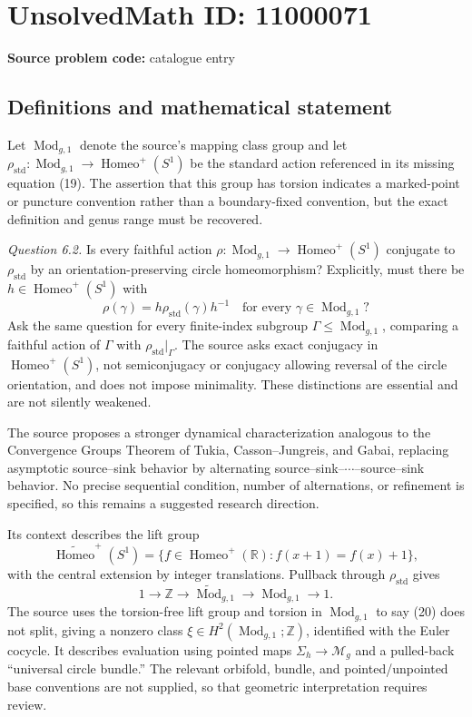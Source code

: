 \documentclass[11pt]{article}
\newcommand{\Z}{\mathbb{Z}}
\newcommand{\R}{\mathbb{R}}
\begin{document}
\section*{UnsolvedMath ID: 11000071}
\textbf{Source problem code:} catalogue entry
\subsection{Definitions and mathematical statement}
Let \(\operatorname{Mod}_{g,1}\) denote the source's mapping class group and let \(\rho_{\mathrm{std}}:\operatorname{Mod}_{g,1}\to\operatorname{Homeo}^+(S^1)\) be the standard action referenced in its missing equation (19). The assertion that this group has torsion indicates a marked-point or puncture convention rather than a boundary-fixed convention, but the exact definition and genus range must be recovered.

\emph{Question 6.2.} Is every faithful action \(\rho:\operatorname{Mod}_{g,1}\to\operatorname{Homeo}^+(S^1)\) conjugate to \(\rho_{\mathrm{std}}\) by an orientation-preserving circle homeomorphism? Explicitly, must there be \(h\in\operatorname{Homeo}^+(S^1)\) with
\[
 \rho(\gamma)=h\rho_{\mathrm{std}}(\gamma)h^{-1}
 \quad\text{for every }\gamma\in\operatorname{Mod}_{g,1}?
\]
Ask the same question for every finite-index subgroup \(\Gamma\leq\operatorname{Mod}_{g,1}\), comparing a faithful action of \(\Gamma\) with \(\rho_{\mathrm{std}}|_\Gamma\). The source asks exact conjugacy in \(\operatorname{Homeo}^+(S^1)\), not semiconjugacy or conjugacy allowing reversal of the circle orientation, and does not impose minimality. These distinctions are essential and are not silently weakened.

The source proposes a stronger dynamical characterization analogous to the Convergence Groups Theorem of Tukia, Casson--Jungreis, and Gabai, replacing asymptotic source--sink behavior by alternating source--sink--\(\cdots\)--source--sink behavior. No precise sequential condition, number of alternations, or refinement is specified, so this remains a suggested research direction.

Its context describes the lift group
\[
 \widetilde{\operatorname{Homeo}}^+(S^1)
 =\{f\in\operatorname{Homeo}^+(\R):f(x+1)=f(x)+1\},
\]
with the central extension by integer translations. Pullback through \(\rho_{\mathrm{std}}\) gives
\[
 1\longrightarrow\Z\longrightarrow
 \widetilde{\operatorname{Mod}}_{g,1}
 \longrightarrow\operatorname{Mod}_{g,1}\longrightarrow1.
 \tag{20}
\]
The source uses the torsion-free lift group and torsion in \(\operatorname{Mod}_{g,1}\) to say (20) does not split, giving a nonzero class \(\xi\in H^2(\operatorname{Mod}_{g,1};\Z)\), identified with the Euler cocycle. It describes evaluation using pointed maps \(\Sigma_h\to\mathcal M_g\) and a pulled-back ``universal circle bundle.'' The relevant orbifold, bundle, and pointed/unpointed base conventions are not supplied, so that geometric interpretation requires review.
\end{document}
